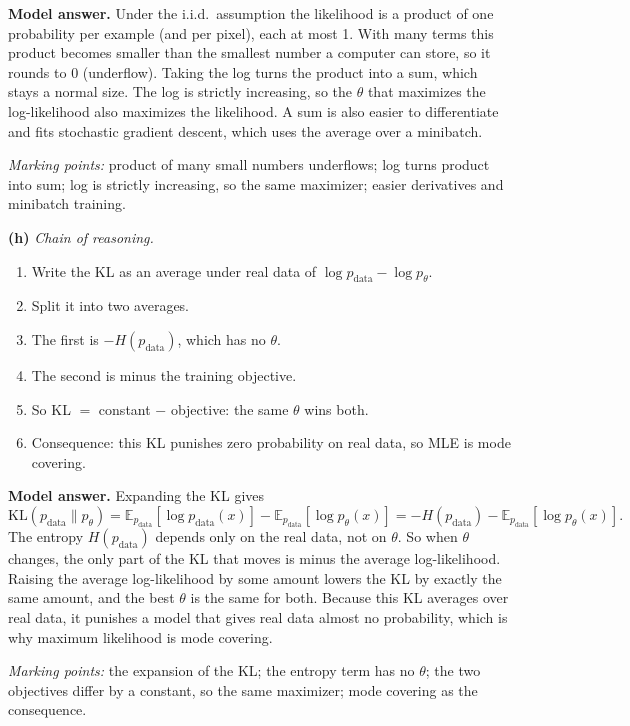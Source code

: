 \documentclass[12pt,a4paper]{article}
\begin{document}
\textbf{Model answer.} Under the i.i.d.\ assumption the likelihood is a product of one probability per example (and per pixel), each at most 1. With many terms this product becomes smaller than the smallest number a computer can store, so it rounds to 0 (underflow). Taking the log turns the product into a sum, which stays a normal size. The log is strictly increasing, so the $\theta$ that maximizes the log-likelihood also maximizes the likelihood. A sum is also easier to differentiate and fits stochastic gradient descent, which uses the average over a minibatch.

\emph{Marking points:} product of many small numbers underflows; log turns product into sum; log is strictly increasing, so the same maximizer; easier derivatives and minibatch training.

\textbf{(h)} \emph{Chain of reasoning.}
\begin{enumerate}[nosep]
  \item Write the KL as an average under real data of $\log p_{\text{data}}-\log p_\theta$.
  \item Split it into two averages.
  \item The first is $-H(p_{\text{data}})$, which has no $\theta$.
  \item The second is minus the training objective.
  \item So KL $=$ constant $-$ objective: the same $\theta$ wins both.
  \item Consequence: this KL punishes zero probability on real data, so MLE is mode covering.
\end{enumerate}

\textbf{Model answer.} Expanding the KL gives
\[
\mathrm{KL}(p_{\text{data}}\|p_\theta)=\mathbb{E}_{p_{\text{data}}}[\log p_{\text{data}}(x)]-\mathbb{E}_{p_{\text{data}}}[\log p_\theta(x)]=-H(p_{\text{data}})-\mathbb{E}_{p_{\text{data}}}[\log p_\theta(x)].
\]
The entropy $H(p_{\text{data}})$ depends only on the real data, not on $\theta$. So when $\theta$ changes, the only part of the KL that moves is minus the average log-likelihood. Raising the average log-likelihood by some amount lowers the KL by exactly the same amount, and the best $\theta$ is the same for both. Because this KL averages over real data, it punishes a model that gives real data almost no probability, which is why maximum likelihood is mode covering.

\emph{Marking points:} the expansion of the KL; the entropy term has no $\theta$; the two objectives differ by a constant, so the same maximizer; mode covering as the consequence.
\end{document}
